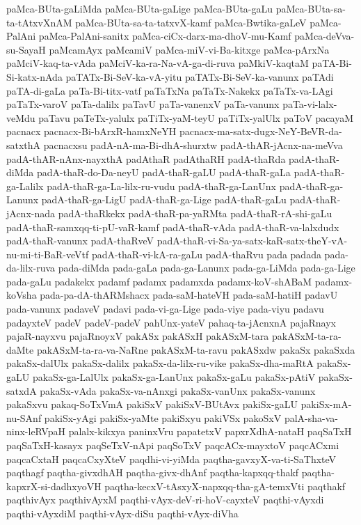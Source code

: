 {paMca-BUta-gaLiMda
paMca-BUta-gaLige
paMca-BUta-gaLu
paMca-BUta-sa-ta-tAtxvXnAM
paMca-BUta-sa-ta-tatxvX-kamf
paMca-Bwtika-gaLeV
paMca-PalAni
paMca-PalAni-sanitx
paMca-ciCx-darx-ma-dhoV-mu-Kamf
paMca-deVva-su-SayaH
paMcamAyx
paMcamiV
paMca-miV-vi-Ba-kitxge
paMca-pArxNa
paMciV-kaq-ta-vAda
paMciV-ka-ra-Na-vA-ga-di-ruva
paMkiV-kaqtaM
paTA-Bi-Si-katx-nAda
paTATx-Bi-SeV-ka-vA-yitu
paTATx-Bi-SeV-ka-vanunx
paTAdi
paTA-di-gaLa
paTa-Bi-titx-vatf
paTaTxNa
paTaTx-Nakekx
paTaTx-va-LAgi
paTaTx-varoV
paTa-dalilx
paTavU
paTa-vanenxV
paTa-vanunx
paTa-vi-lalx-veMdu
paTavu
paTeTx-yalulx
paTiTx-yaM-teyU
paTiTx-yalUlx
paToV
pacayaM
pacnacx
pacnacx-Bi-bArxR-hamxNeYH
pacnacx-ma-satx-dugx-NeY-BeVR-da-satxthA
pacnacxsu
padA-nA-ma-Bi-dhA-shurxtw
padA-thAR-jAcnx-na-meVva
padA-thAR-nAnx-nayxthA
padAthaR
padAthaRH
padA-thaRda
padA-thaR-diMda
padA-thaR-do-Da-neyU
padA-thaR-gaLU
padA-thaR-gaLa
padA-thaR-ga-Lalilx
padA-thaR-ga-La-lilx-ru-vudu
padA-thaR-ga-LanUnx
padA-thaR-ga-Lanunx
padA-thaR-ga-LigU
padA-thaR-ga-Lige
padA-thaR-gaLu
padA-thaR-jAcnx-nada
padA-thaRkekx
padA-thaR-pa-yaRMta
padA-thaR-rA-shi-gaLu
padA-thaR-samxqq-ti-pU-vaR-kamf
padA-thaR-vAda
padA-thaR-va-lalxdudx
padA-thaR-vanunx
padA-thaRveV
padA-thaR-vi-Sa-ya-satx-kaR-satx-theY-vA-nu-mi-ti-BaR-veVtf
padA-thaR-vi-kA-ra-gaLu
padA-thaRvu
pada
padada
pada-da-lilx-ruva
pada-diMda
pada-gaLa
pada-ga-Lanunx
pada-ga-LiMda
pada-ga-Lige
pada-gaLu
padakekx
padamf
padamx
padamxda
padamx-koV-shABaM
padamx-koVsha
pada-pa-dA-thARMshacx
pada-saM-hateVH
pada-saM-hatiH
padavU
pada-vanunx
padaveV
padavi
pada-vi-ga-Lige
pada-viye
pada-viyu
padavu
padayxteV
padeV
padeV-padeV
pahUnx-yateV
pahaq-ta-jAcnxnA
pajaRnayx
pajaR-nayxvu
pajaRnoyxV
pakASx
pakASxH
pakASxM-tara
pakASxM-ta-ra-daMte
pakASxM-ta-ra-va-NaRne
pakASxM-ta-ravu
pakASxdw
pakaSx
pakaSxda
pakaSx-dalUlx
pakaSx-dalilx
pakaSx-da-lilx-ru-vike
pakaSx-dha-maRtA
pakaSx-gaLU
pakaSx-ga-LalUlx
pakaSx-ga-LanUnx
pakaSx-gaLu
pakaSx-pAtiV
pakaSx-satxdA
pakaSx-vAda
pakaSx-va-nAnxgi
pakaSx-vanUnx
pakaSx-vanunx
pakaSxvu
pakaq-SoTxVmA
pakiSxV
pakiSxV-BUtAvx
pakiSx-gaLU
pakiSx-mA-nu-SAnf
pakiSx-yAgi
pakiSx-yaMte
pakiSxyu
pakiVSx
pakoSxV
palA-sha-va-ninx-leRVpaH
palalx-kikxya
paninxVru
papatetxV
papxrXdhA-nataH
paqSaTxH
paqSaTxH-kasayx
paqSeTxV-nApi
paqSoTxV
paqcACx-mayxtoV
paqcACxmi
paqcaCxtaH
paqcaCxyXteV
paqdhi-vi-yiMda
paqtha-gavxyX-va-ti-SaThxteV
paqthagf
paqtha-givxdhAH
paqtha-givx-dhAnf
paqtha-kapxqq-thakf
paqtha-kapxrX-si-dadhxyoVH
paqtha-kecxV-tAsxyX-napxqq-tha-gA-temxVti
paqthakf
paqthivAyx
paqthivAyxM
paqthi-vAyx-deV-ri-hoV-cayxteV
paqthi-vAyxdi
paqthi-vAyxdiM
paqthi-vAyx-diSu
paqthi-vAyx-diVha
}
